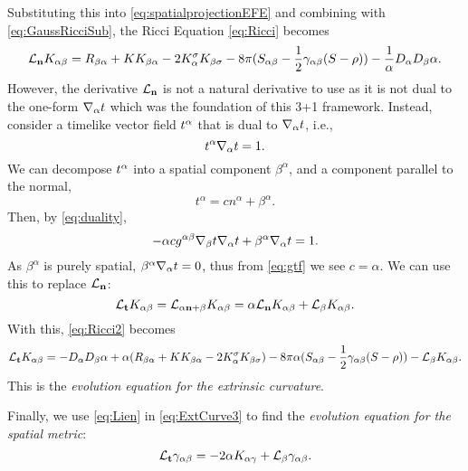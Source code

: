 Substituting this into \ref{eq:spatialprojectionEFE} and combining with \ref{eq:GaussRicciSub}, the Ricci Equation \ref{eq:Ricci} becomes
\begin{equation}
\label{eq:Ricci2}
{\mathcal{L}}_{\mathbf{n}} K_{\alpha \beta}=  R_{\beta \alpha} + K K_{\beta \alpha}-2 K^\sigma_\alpha K_{\beta \sigma} - 8\pi(S_{\alpha \beta} - \frac{1}{2}\gamma_{\alpha \beta}(S-\rho))-\frac{1}{\alpha}D_\alpha D_\beta \alpha.
\end{equation}
However, the derivative ${\mathcal{L}}_{\mathbf{n}}$ is not a natural derivative to use as it is not dual to the one-form ${\nabla}_\alpha t$ which was the foundation of this 3+1 framework. Instead, consider a timelike vector field $t^{\alpha}$ that is dual to ${\nabla}_\alpha t$, i.e.,
\begin{equation}\label{eq:duality}
t^{\alpha} {\nabla}_\alpha t = 1.
\end{equation}
We can decompose $t^{\alpha}$ into a spatial component $\beta^\alpha$, and a component parallel to the normal,
\begin{equation}\label{eq:tdecomp}
t^\alpha = cn^\alpha + \beta^\alpha.
\end{equation}
Then, by \ref{eq:duality},
\begin{equation}
-\alpha c g^{ \alpha \beta } {\nabla}_\beta t {\nabla}_\alpha t + \beta^\alpha {\nabla}_\alpha t = 1.
\end{equation}
As $\beta^\alpha$ is purely spatial, $\beta^\alpha {\nabla}_\alpha t=0$, thus from \ref{eq:gtf} we see $c=\alpha$. We can use this to replace ${\mathcal{L}}_{\mathbf{n}}$:
\begin{equation}
\label{eq:Lien}
{\mathcal{L}}_{\mathbf{t}} K_{\alpha \beta} = {\mathcal{L}}_{\alpha \mathbf{n} + \beta} K_{\alpha \beta}=\alpha {\mathcal{L}}_{\mathbf{n}}  K_{\alpha \beta}+{\mathcal{L}}_\beta K_{\alpha \beta}.
\end{equation}
With this, \ref{eq:Ricci2} becomes
\begin{equation}
\label{eq:EvolutionEquationK}
{\mathcal{L}}_{\mathbf{t}} K_{\alpha \beta}= -D_\alpha D_\beta \alpha + \alpha(R_{\beta \alpha} + K K_{\beta \alpha}-2 K^\sigma_\alpha K_{\beta \sigma}) - 8\pi\alpha(S_{\alpha \beta} - \frac{1}{2}\gamma_{\alpha \beta}(S-\rho))-{\mathcal{L}}_\beta K_{\alpha \beta}.
\end{equation}
This is the \textit{evolution equation for the extrinsic curvature}. 

Finally, we use \ref{eq:Lien} in \ref{eq:ExtCurve3} to find the \textit{evolution equation for the spatial metric}:
\begin{equation}
\label{eq:EvolutionEquationGamma}
{\mathcal{L}}_{\mathbf{t}} \gamma_{\alpha \beta} = -2\alpha K_{\alpha \gamma} + {\mathcal{L}}_\beta \gamma_{\alpha \beta}.
\end{equation}

